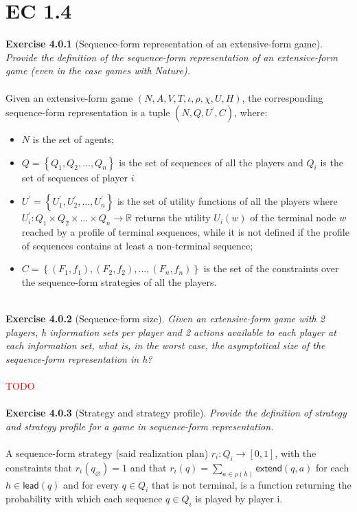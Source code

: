 \section{EC 1.4}
\textbf{Exercise 4.0.1} (Sequence-form representation of an extensive-form game). \textit{Provide the definition of the sequence-form representation of an extensive-form game (even in the case games with Nature).}\\\\
Given an extensive-form game $(N, A, V, T, \iota, \rho, \chi, U, H)$,  the corresponding sequence-form representation is a tuple $ (N, Q, U^{\prime}, C) $,  where:
\begin{itemize}
\item $N$ is the set of agents;
\item $ Q=\left\{Q_{1}, Q_{2}, \ldots, Q_{n}\right\}$ is the set of sequences of all the players and $Q_{i}$ is the set of sequences of player $i$
\item $U^{\prime}=\left\{U_{1}^{\prime}, U_{2}^{\prime}, \ldots, U_{n}^{\prime}\right\}$ is the set of utility functions of all the players where $U_{i}^{\prime}: Q_{1} \times Q_{2} \times \ldots \times Q_{n} \rightarrow \mathbb{R}$ returns the utility $U_{i}(w)$ of the terminal node $w$ reached by a profile of terminal sequences, while it is not defined if the profile of sequences contains at least a non-terminal sequence;
\item $ C=\left\{\left(F_{1}, f_{1}\right),\left(F_{2}, f_{2}\right), \ldots,\left(F_{n}, f_{n}\right)\right\}$ is the set of the constraints over the sequence-form strategies of all the players.\\\\
\end{itemize}
\textbf{Exercise 4.0.2} (Sequence-form size). \textit{Given an extensive-form game with 2 players, h information sets per player and 2 actions available to each player at each information set, what is, in the worst case, the asymptotical size of the sequence-form representation in h?}\\\\
\textcolor{red}{TODO}\\\\
\textbf{Exercise 4.0.3} (Strategy and strategy profile). \textit{Provide the definition of strategy and strategy profile for a game in sequence-form representation.}\\\\
A sequence-form strategy (said realization plan) $ r_i: Q_i \rightarrow [0,1] $, with the constraints that $ r_{i}(q_\varnothing) = 1 $ and that $ r_{i}(q) = \sum_{a \in \rho(h)} \mathsf{extend} (q,a) $ for each $ h \in \mathsf{lead}(q) $ and for every $ q \in Q_{i} $ that is not terminal, is a function returning the probability with which each sequence $ q \in Q_{i} $ is played by player i.\\\\

